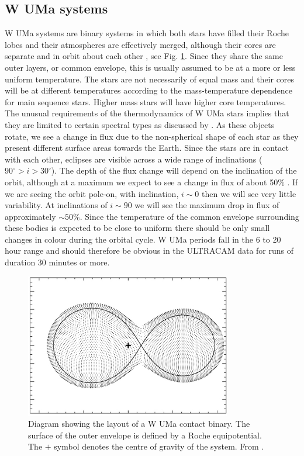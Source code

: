 \subsection{{W UMa} systems}
{W UMa} systems are binary systems in which both stars have filled their Roche lobes and their atmospheres are effectively merged, although their cores are separate and in orbit about each other \citep{Lucy68}, see Fig. \ref{fig:wumadiagram}. Since they share the same outer layers, or common envelope, this is usually assumed to be at a more or less uniform temperature. The stars are not necessarily of equal mass and their cores will be at different temperatures according to the mass-temperature dependence for main sequence stars. Higher mass stars will have higher core temperatures. The unusual requirements of the thermodynamics of W UMa stars implies that they are limited to certain spectral types as discussed by \citeauthor{Lucy68}.  As these objects rotate, we see a change in flux due to the non-spherical shape of each star as they present different surface areas towards the Earth. Since the stars are in contact with each other, eclipses are visible across a wide range of inclinations ($90^\circ > i > 30^\circ$). The depth of the flux change will depend on the inclination of the orbit, although at a maximum we expect to see a change in flux of about 50\% \citep{Lucy68}. If we are seeing the orbit pole-on, with inclination, $i \sim 0$ then we will see very little variability. At inclinations of $i \sim 90$ we will see the maximum drop in flux of approximately $\sim50\%$. Since the temperature of the common envelope surrounding these bodies is expected to be close to uniform there should be only small changes in colour during the orbital cycle. W UMa periods fall in the 6 to 20 hour range and should therefore be obvious in the ULTRACAM data for runs of duration 30 minutes or more. 

\begin{figure}
\centering
\includegraphics[width=90mm]{images/wuma_diagram.png}
\caption{Diagram showing the layout of a {W UMa} contact binary. The surface of the outer envelope is defined by a Roche equipotential. The $+$ symbol denotes the centre of gravity of the system.  From \citet{0004-637X-764-1-62}. }
\label{fig:wumadiagram}
\end{figure}

